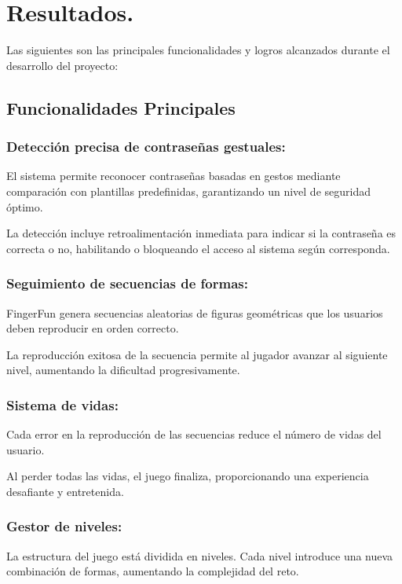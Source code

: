 \chapter{Resultados.}

Las siguientes son las principales funcionalidades y logros alcanzados durante el desarrollo del proyecto:

\section{Funcionalidades Principales}

\subsection{Detección precisa de contraseñas gestuales:}

El sistema permite reconocer contraseñas basadas en gestos mediante comparación con plantillas predefinidas, garantizando un nivel de seguridad óptimo.

La detección incluye retroalimentación inmediata para indicar si la contraseña es correcta o no, habilitando o bloqueando el acceso al sistema según corresponda.

\subsection{Seguimiento de secuencias de formas:}

FingerFun genera secuencias aleatorias de figuras geométricas que los usuarios deben reproducir en orden correcto.

La reproducción exitosa de la secuencia permite al jugador avanzar al siguiente nivel, aumentando la dificultad progresivamente.

\subsection{Sistema de vidas:}

Cada error en la reproducción de las secuencias reduce el número de vidas del usuario.

Al perder todas las vidas, el juego finaliza, proporcionando una experiencia desafiante y entretenida.

\subsection{Gestor de niveles:}

La estructura del juego está dividida en niveles. Cada nivel introduce una nueva combinación de formas, aumentando la complejidad del reto.

